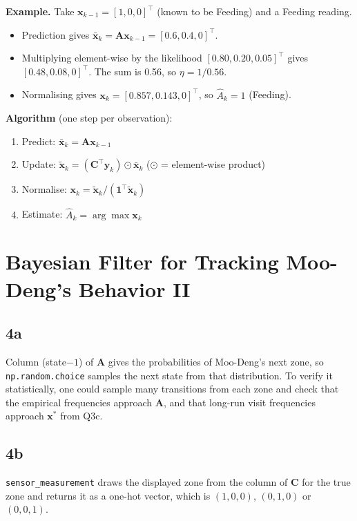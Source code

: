 \documentclass[11pt]{article}
\newcommand{\vect}[1]{\mathbf{#1}}
\newcommand{\mat}[1]{\mathbf{#1}}
\begin{document}
\textbf{Example.} Take $\vect{x}_{k-1} = [1, 0, 0]^\top$ (known to be Feeding) and a Feeding reading.
\begin{itemize}
    \item Prediction gives $\bar{\vect{x}}_k = \mat{A}\vect{x}_{k-1} = [0.6, 0.4, 0]^\top$.
    \item Multiplying element-wise by the likelihood $[0.80, 0.20, 0.05]^\top$ gives $[0.48, 0.08, 0]^\top$. The sum is 0.56, so $\eta = 1/0.56$.
    \item Normalising gives $\vect{x}_k = [0.857, 0.143, 0]^\top$, so $\hat{A}_k = 1$ (Feeding).
\end{itemize}

\textbf{Algorithm} (one step per observation):
\begin{enumerate}
    \item Predict: $\bar{\vect{x}}_k = \mat{A}\vect{x}_{k-1}$
    \item Update: $\tilde{\vect{x}}_k = (\mat{C}^\top\vect{y}_k) \odot \bar{\vect{x}}_k$ ($\odot$ = element-wise product)
    \item Normalise: $\vect{x}_k = \tilde{\vect{x}}_k / (\vect{1}^\top\tilde{\vect{x}}_k)$
    \item Estimate: $\hat{A}_k = \arg\max \vect{x}_k$
\end{enumerate}

\clearpage
\section{Bayesian Filter for Tracking Moo-Deng's Behavior II}

\subsection*{4a}

Column (state$-1$) of $\mat{A}$ gives the probabilities of Moo-Deng's next zone, so \texttt{np.random.choice} samples the next state from that distribution. To verify it statistically, one could sample many transitions from each zone and check that the empirical frequencies approach $\mat{A}$, and that long-run visit frequencies approach $\vect{x}^*$ from Q3c.

\subsection*{4b}

\texttt{sensor\_measurement} draws the displayed zone from the column of $\mat{C}$ for the true zone and returns it as a one-hot vector, which is $(1,0,0)$, $(0,1,0)$ or $(0,0,1)$.
\end{document}
